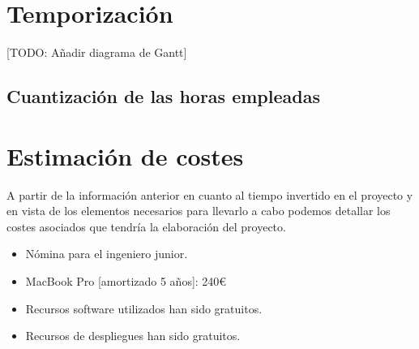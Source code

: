 \section{Temporización}
[TODO: Añadir diagrama de Gantt]

\subsection{Cuantización de las horas empleadas}

\section{Estimación de costes}
A partir de la información anterior en cuanto al tiempo invertido en el proyecto y en vista de los elementos necesarios
para llevarlo a cabo podemos detallar los costes asociados que tendría la elaboración del proyecto.

\begin{itemize}
    \item Nómina para el ingeniero junior.
    \item MacBook Pro [amortizado 5 años]: 240€
    \item Recursos software utilizados han sido gratuitos.
    \item Recursos de despliegues han sido gratuitos.
\end{itemize}